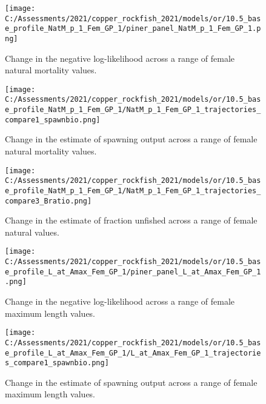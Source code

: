 \documentclass[11pt,
  english,
  a4paper,
]{article}
\begin{document}
\begin{figure}
\centering
\texttt{[image: C:/Assessments/2021/copper\_rockfish\_2021/models/or/10.5\_base\_profile\_NatM\_p\_1\_Fem\_GP\_1/piner\_panel\_NatM\_p\_1\_Fem\_GP\_1.png]}
\caption{Change in the negative log-likelihood across a range of female natural mortality values.\label{fig:m-profile}}
\end{figure}

\tagmcend\tagstructend


\begin{figure}
\centering
\texttt{[image: C:/Assessments/2021/copper\_rockfish\_2021/models/or/10.5\_base\_profile\_NatM\_p\_1\_Fem\_GP\_1/NatM\_p\_1\_Fem\_GP\_1\_trajectories\_compare1\_spawnbio.png]}
\caption{Change in the estimate of spawning output across a range of female natural mortality values.\label{fig:m-ssb}}
\end{figure}

\tagmcend\tagstructend


\begin{figure}
\centering
\texttt{[image: C:/Assessments/2021/copper\_rockfish\_2021/models/or/10.5\_base\_profile\_NatM\_p\_1\_Fem\_GP\_1/NatM\_p\_1\_Fem\_GP\_1\_trajectories\_compare3\_Bratio.png]}
\caption{Change in the estimate of fraction unfished across a range of female natural values.\label{fig:m-depl}}
\end{figure}

\tagmcend\tagstructend


\begin{figure}
\centering
\texttt{[image: C:/Assessments/2021/copper\_rockfish\_2021/models/or/10.5\_base\_profile\_L\_at\_Amax\_Fem\_GP\_1/piner\_panel\_L\_at\_Amax\_Fem\_GP\_1.png]}
\caption{Change in the negative log-likelihood across a range of female maximum length values.\label{fig:linf-profile}}
\end{figure}

\tagmcend\tagstructend


\begin{figure}
\centering
\texttt{[image: C:/Assessments/2021/copper\_rockfish\_2021/models/or/10.5\_base\_profile\_L\_at\_Amax\_Fem\_GP\_1/L\_at\_Amax\_Fem\_GP\_1\_trajectories\_compare1\_spawnbio.png]}
\caption{Change in the estimate of spawning output across a range of female maximum length values.\label{fig:linf-ssb}}
\end{figure}
\end{document}
